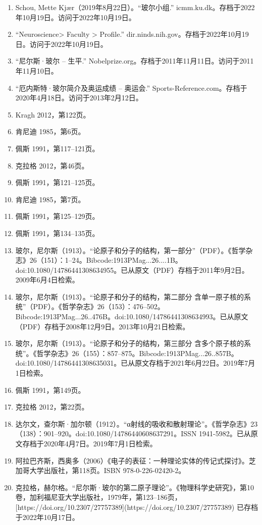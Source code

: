 \begin{enumerate}
\item Schou, Mette Kjær（2019年8月22日）。“玻尔小组.” icmm.ku.dk。存档于2022年10月19日。访问于2022年10月19日。
\item “Neuroscience\@NIH > Faculty > Profile.” dir.ninds.nih.gov。存档于2022年10月19日。访问于2022年10月19日。
\item “尼尔斯·玻尔 – 生平.” Nobelprize.org。存档于2011年11月11日。访问于2011年11月10日。
\item “厄内斯特·玻尔简介及奥运成绩 – 奥运会.” Sports-Reference.com。存档于2020年4月18日。访问于2013年2月12日。
\item Kragh 2012，第122页。
\item 肯尼迪 1985，第6页。
\item 佩斯 1991，第117–121页。
\item 克拉格 2012，第46页。
\item 佩斯 1991，第121–125页。
\item 肯尼迪 1985，第7页。
\item 佩斯 1991，第125–129页。
\item 佩斯 1991，第134–135页。
\item 玻尔，尼尔斯（1913）。“论原子和分子的结构，第一部分”（PDF）。《哲学杂志》26（151）：1–24。Bibcode:1913PMag...26....1B。doi:10.1080/14786441308634955。已从原文（PDF）存档于2011年9月2日。2009年6月4日检索。
\item 玻尔，尼尔斯（1913）。“论原子和分子的结构，第二部分 含单一原子核的系统”（PDF）。《哲学杂志》26（153）：476–502。Bibcode:1913PMag...26..476B。doi:10.1080/14786441308634993。已从原文（PDF）存档于2008年12月9日。2013年10月21日检索。
\item 玻尔，尼尔斯（1913）。“论原子和分子的结构，第三部分 含多个原子核的系统”。《哲学杂志》26（155）：857–875。Bibcode:1913PMag...26..857B。doi:10.1080/14786441308635031。已从原文存档于2021年6月22日。2019年7月1日检索。
\item 佩斯 1991，第149页。
\item 克拉格 2012，第22页。
\item 达尔文，查尔斯·加尔顿（1912）。“α射线的吸收和散射理论”。《哲学杂志》23（138）：901–920。doi:10.1080/14786440608637291。ISSN 1941-5982。已从原文存档于2020年4月7日。2019年7月1日检索。
\item 阿拉巴齐斯，西奥多（2006）《电子的表征：一种理论实体的传记式探讨》。芝加哥大学出版社，第118页。ISBN 978-0-226-02420-2。
\item 克拉格，赫尔格。“尼尔斯·玻尔的第二原子理论”。《物理科学史研究》，第10卷，加利福尼亚大学出版社，1979年，第123–186页，[https://doi.org/10.2307/27757389](https://doi.org/10.2307/27757389) 已存档于2022年10月17日。

\end{enumerate}
